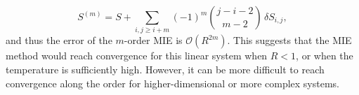 \documentclass[reprint, superscriptaddress]{revtex4-1}
\begin{document}
%
$$
S^{(m)} = S + \sum_{i, j \ge i+m} (-1)^m {j-i-2 \choose m-2} \, \delta S_{i,j}
,
$$
and thus the error of the $m$-order MIE is $\mathcal O(R^{2m})$.
%
This suggests that the MIE method would reach convergence
for this linear system when $R < 1$, or when the temperature is sufficiently high.
%
However, it can be more difficult to reach convergence along the order
for higher-dimensional or more complex systems.\cite{goethe2017}



\end{document}
